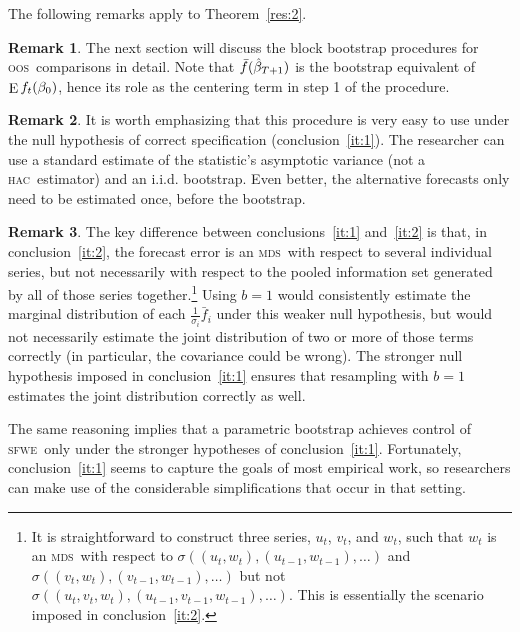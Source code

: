 \documentclass[11pt,fleqn]{article}
\theoremstyle{definition}
\newtheorem{rem}{Remark}
\DeclareMathOperator{\E}{E}
\newcommand{\btrue}[1][]{\if#1*\hat\beta_{T+1}\else\beta_0\fi}
\newcommand{\hac}{\textsc{hac}}
\newcommand{\mds}{\textsc{mds}}
\newcommand{\oos}{\textsc{oos}}
\newcommand{\sfwe}{\textsc{sfwe}}
\begin{document}
The following remarks apply to Theorem~\ref{res:2}.

\begin{rem}
  The next section will discuss the block bootstrap procedures for
  \oos\ comparisons in detail.  Note that $\bar f(\btrue[*])$ is the
  bootstrap equivalent of $\E f_t(\btrue)$, hence its role as the
  centering term in step 1 of the procedure.
\end{rem}

\begin{rem}
It is worth emphasizing that this procedure is very easy to use under
the null hypothesis of correct specification (conclusion~\ref{it:1}).  The
researcher can use a standard estimate of the statistic's asymptotic
variance (not a \hac\ estimator) and an i.i.d. bootstrap.  Even
better, the alternative forecasts only need to be estimated once,
before the bootstrap.
\end{rem}

\begin{rem}\label{rem:2}
  The key difference between conclusions~\ref{it:1} and~\ref{it:2} is
  that, in conclusion~\ref{it:2}, the forecast error is an \mds\ with
  respect to several individual series, but not necessarily with
  respect to the pooled information set generated by all of those
  series together.\footnote{It is straightforward to construct three
    series, $u_t$, $v_t$, and $w_t$, such that $w_t$ is an \mds\ with
    respect to $\sigma((u_t, w_t), (u_{t-1}, w_{t-1}),\dots)$ and
    $\sigma((v_t, w_t), (v_{t-1}, w_{t-1}),\dots)$ but not
    $\sigma((u_t, v_t, w_t), (u_{t-1}, v_{t-1}, w_{t-1}),\dots)$.
    This is essentially the scenario imposed in conclusion~\ref{it:2}.}
  Using $b = 1$ would consistently estimate the marginal distribution
  of each $\tfrac1{\sigma_i} \bar{f}_i$ under this weaker null
  hypothesis, but would not necessarily estimate the joint
  distribution of two or more of those terms correctly (in particular,
  the covariance could be wrong).  The stronger null hypothesis
  imposed in conclusion~\ref{it:1} ensures that resampling with $b = 1$
  estimates the joint distribution correctly as well.

  The same reasoning implies that a parametric bootstrap
  \citep[i.e.][]{ClM:12b} achieves control of \sfwe\ only under the
  stronger hypotheses of conclusion~\ref{it:1}.  Fortunately,
  conclusion~\ref{it:1} seems to capture the goals of most empirical work,
  so researchers can make use of the considerable simplifications that
  occur in that setting.
\end{rem}
\end{document}
